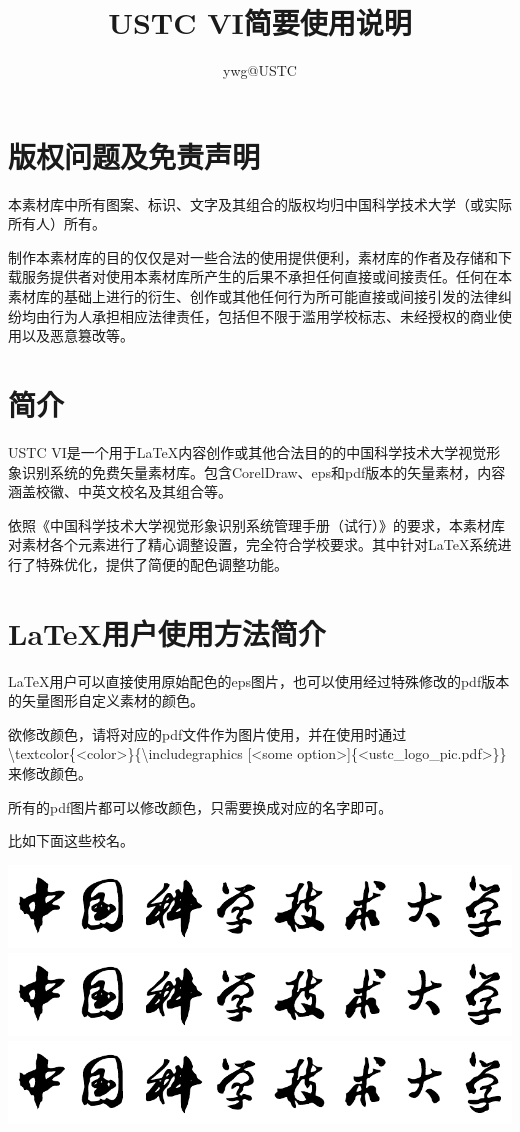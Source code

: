 \documentclass{article}
\title{USTC VI简要使用说明}
\author{ywg@USTC}
\date{}
\begin{document}
\maketitle
\section{版权问题及免责声明}
本素材库中所有图案、标识、文字及其组合的版权均归中国科学技术大学（或实际所有人）所有。

制作本素材库的目的仅仅是对一些合法的使用提供便利，素材库的作者及存储和下载服务提供者对使用本素材库所产生的后果不承担任何直接或间接责任。任何在本素材库的基础上进行的衍生、创作或其他任何行为所可能直接或间接引发的法律纠纷均由行为人承担相应法律责任，包括但不限于滥用学校标志、未经授权的商业使用以及恶意篡改等。

\section{简介}
USTC VI是一个用于\LaTeX{}内容创作或其他合法目的的中国科学技术大学视觉形象识别系统的免费矢量素材库。包含CorelDraw、eps和pdf版本的矢量素材，内容涵盖校徽、中英文校名及其组合等。

依照《中国科学技术大学视觉形象识别系统管理手册（试行）》的要求，本素材库对素材各个元素进行了精心调整设置，完全符合学校要求。其中针对\LaTeX{}系统进行了特殊优化，提供了简便的配色调整功能。

\section{\LaTeX{}用户使用方法简介}
\LaTeX{}用户可以直接使用原始配色的eps图片，也可以使用经过特殊修改的pdf版本的矢量图形自定义素材的颜色。

欲修改颜色，请将对应的pdf文件作为图片使用，并在使用时通过\textbackslash{}textcolor\{<color>\}\{\textbackslash{}includegraphics [<some option>]\{<ustc\_logo\_pic.pdf>\}\}来修改颜色。

所有的pdf图片都可以修改颜色，只需要换成对应的名字即可。

比如下面这些校名。

\noindent
\textcolor{ustcblue}{\includegraphics[width=\textwidth]{./pdffigures/ustc_logo_text.pdf}}
\textcolor{red}{\includegraphics[width=\textwidth]{./pdffigures/ustc_logo_text.pdf}}
\textcolor{black}{\includegraphics[width=\textwidth]{./pdffigures/ustc_logo_text.pdf}}
\end{document}
